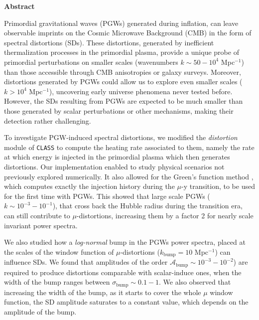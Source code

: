 \vspace*{10pt}
\begin{center}
	\large\textbf{Abstract}\normalsize
\end{center}
\vspace*{10pt}
\begin{adjustwidth}{1cm}{1cm}
Primordial gravitational waves (PGWs) generated during inflation, can leave observable imprints on
the Cosmic Microwave Background (CMB) in the form of spectral distortions (SDs). These distortions,
generated by inefficient thermalization processes in the primordial plasma, provide a unique probe of
primordial perturbations on smaller scales (wavenumbers $k \sim 50 - 10^{4}$ Mpc$^{-1}$) than those accessible
through CMB anisotropies or galaxy surveys. Moreover, distortions generated by PGWs could allow us to
explore even smaller scales ($k > 10^{4}$ Mpc$^{-1}$), uncovering early universe phenomena never tested before. However, the SDs resulting from PGWs are expected to be much smaller than those generated by scalar perturbations or other mechanisms, making their detection rather challenging.

To investigate PGW-induced spectral distortions, we modified the \emph{distortion} module of \texttt{\texttt{CLASS}} to compute the heating rate associated to them, namely the rate at which energy is injected in the primordial plasma which then generates distortions. Our implementation enabled to study physical
scenarios not previously explored numerically. It also allowed for the Green’s function method \cite{Chluba_Green}, which computes exactly the injection history during the $\mu$-y transition, to be used for the first time with PGWs. This showed that large scale PGWs ($k\sim 10^{-3}-10^{-1}$), that cross back the Hubble radius during the transition era, can still contribute to $\mu$-distortions, increasing them by a factor 2 for nearly scale invariant power spectra.

We also studied how a \emph{log-normal} bump in the PGWs power spectra, placed at the scales of the window function of $\mu$-distortions ($k_\text{bump}=10$ Mpc$^{-1}$) can influence SDs. We found that amplitudes of the order $\mathcal{A}_\text{bump}\sim 10^{-3}-10^{-2}$) are required to produce distortions comparable with scalar-induce ones, when the width of the bump ranges between $\sigma_\text{bump}\sim 0.1-1$. We also observed that increasing the width of the bump, as it starts to cover the whole $\mu$ window function, the SD amplitude saturates to a constant value, which depends on the amplitude of the bump. 


\end{adjustwidth}
